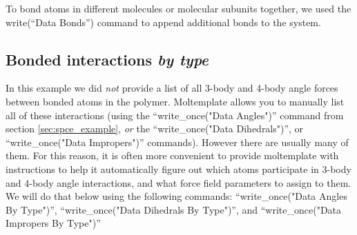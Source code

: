 \documentclass[11pt]{article}
\begin{document}
To bond atoms in different molecules or molecular subunits together, we used 
the write(``Data Bonds'') command to append additional bonds to the system.



\subsection{Bonded interactions \textit{by type}}
\label{sec:nbody_by_type_intro}

In this example we did \textit{not} provide a list of all 3-body
and 4-body angle forces between bonded atoms in the polymer.
Moltemplate allows you to manually list all of these interactions
(using the ``write\_once("Data Angles")'' command
from section \ref{sec:spce_example},
\textit{or} 
the ``write\_once("Data Dihedrals")'', 
or ``write\_once("Data Impropers")'' commands).
However there are usually many of them.
For this reason, it is often more convenient to provide
moltemplate with instructions to help it automatically figure out 
which atoms participate in 3-body and 4-body angle interactions,
and what force field parameters to assign to them.
We will do that below using the following commands:
``write\_once("Data Angles By Type")'',
``write\_once("Data Dihedrals By Type")'', and
``write\_once("Data Impropers By Type")''

\end{document}
